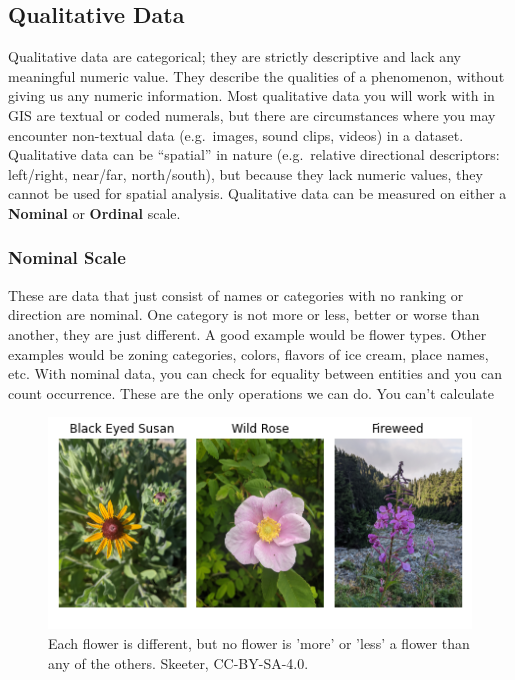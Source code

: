 \documentclass[
]{book}
\begin{document}
\subsection{Qualitative Data}\label{qualitative-data}

Qualitative data are categorical; they are strictly descriptive and lack any meaningful numeric value. They describe the qualities of a phenomenon, without giving us any numeric information. Most qualitative data you will work with in GIS are textual or coded numerals, but there are circumstances where you may encounter non-textual data (e.g.~images, sound clips, videos) in a dataset. Qualitative data can be ``spatial'' in nature (e.g.~relative directional descriptors: left/right, near/far, north/south), but because they lack numeric values, they cannot be used for spatial analysis. Qualitative data can be measured on either a \textbf{Nominal} or \textbf{Ordinal} scale.

\subsubsection{Nominal Scale}\label{nominal-scale}

These are data that just consist of names or categories with no ranking or direction are nominal. One category is not more or less, better or worse than another, they are just different. A good example would be flower types. Other examples would be zoning categories, colors, flavors of ice cream, place names, etc. With nominal data, you can check for equality between entities and you can count occurrence. These are the only operations we can do. You can't calculate

\begin{figure}
\includegraphics[width=0.75\linewidth]{images/03-flowers-nominal} \caption{Each flower is different, but no flower is 'more' or 'less' a flower than any of the others. Skeeter, CC-BY-SA-4.0.}\label{fig:3-flowers-nominal}
\end{figure}
\end{document}

